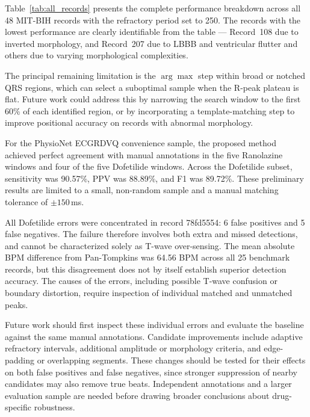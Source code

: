 \documentclass[11pt]{article}
\begin{document}
Table~\ref{tab:all_records} presents the complete performance breakdown across all 48 MIT-BIH records with the refractory period set to 250. The records with the lowest performance are clearly identifiable from the table --- Record~108 due to inverted morphology, and Record~207 due to LBBB and ventricular flutter and others due to varying morphological complexities.

The principal remaining limitation is the $\arg\max$ step within broad or notched QRS regions, which can select a suboptimal sample when the R-peak plateau is flat. Future work could address this by narrowing the search window to the first 60\% of each identified region, or by incorporating a template-matching step to improve positional accuracy on records with abnormal morphology.

For the PhysioNet ECGRDVQ convenience sample, the proposed method achieved perfect agreement with manual annotations in the five Ranolazine windows and four of the five Dofetilide windows. Across the Dofetilide subset, sensitivity was 90.57\%, PPV was 88.89\%, and F1 was 89.72\%. These preliminary results are limited to a small, non-random sample and a manual matching tolerance of $\pm150$\,ms.

All Dofetilide errors were concentrated in record 78fd5554: 6 false positives and 5 false negatives. The failure therefore involves both extra and missed detections, and cannot be characterized solely as T-wave over-sensing. The mean absolute BPM difference from Pan-Tompkins was 64.56 BPM across all 25 benchmark records, but this disagreement does not by itself establish superior detection accuracy. The causes of the errors, including possible T-wave confusion or boundary distortion, require inspection of individual matched and unmatched peaks.

Future work should first inspect these individual errors and evaluate the baseline against the same manual annotations. Candidate improvements include adaptive refractory intervals, additional amplitude or morphology criteria, and edge-padding or overlapping segments. These changes should be tested for their effects on both false positives and false negatives, since stronger suppression of nearby candidates may also remove true beats. Independent annotations and a larger evaluation sample are needed before drawing broader conclusions about drug-specific robustness.
\end{document}
